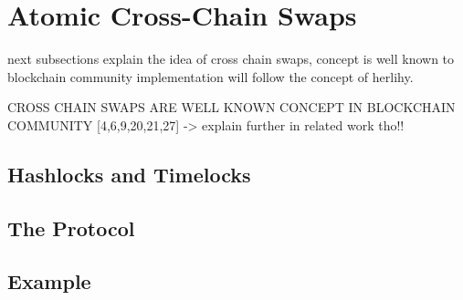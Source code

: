 \clearpage


\section{Atomic Cross-Chain Swaps}
\label{sec:background:fifth_section}


next subsections explain the idea of cross chain swaps,
concept is well known to blockchain community 
implementation will follow the concept of herlihy.

CROSS CHAIN SWAPS ARE WELL KNOWN CONCEPT IN BLOCKCHAIN COMMUNITY [4,6,9,20,21,27] -> explain further in related work tho!!

\cite{herlihy2018atomic}

\subsection{Hashlocks and Timelocks}
\label{subsec:background:second_section:hashlock_timelock}

\subsection{The Protocol}
\label{subsec:background:second_section:protocol}

\subsection{Example}
\label{subsec:background:second_section:example}